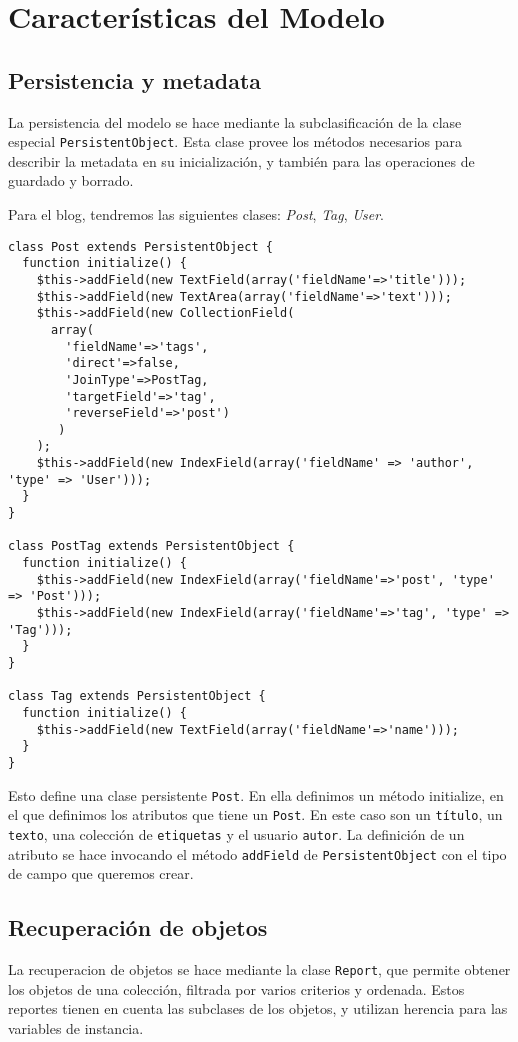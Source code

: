 \section{Características del Modelo}

\subsection{Persistencia y metadata}
\label{sub-pers}

La persistencia del modelo se hace mediante la subclasificación de la clase especial \verb"PersistentObject".
Esta clase provee los métodos necesarios para describir la metadata en su inicialización, y también para las operaciones de guardado y borrado.

Para el blog, tendremos las siguientes clases: \emph{Post}, \emph{Tag}, \emph{User}.

\begin{verbatim}
class Post extends PersistentObject {
  function initialize() {
    $this->addField(new TextField(array('fieldName'=>'title')));
    $this->addField(new TextArea(array('fieldName'=>'text')));
    $this->addField(new CollectionField(
      array(
        'fieldName'=>'tags',
        'direct'=>false,
        'JoinType'=>PostTag,
        'targetField'=>'tag',
        'reverseField'=>'post')
       )
    );
    $this->addField(new IndexField(array('fieldName' => 'author', 'type' => 'User')));
  }
}

class PostTag extends PersistentObject {
  function initialize() {
    $this->addField(new IndexField(array('fieldName'=>'post', 'type' => 'Post')));
    $this->addField(new IndexField(array('fieldName'=>'tag', 'type' => 'Tag')));
  }
}

class Tag extends PersistentObject {
  function initialize() {
    $this->addField(new TextField(array('fieldName'=>'name')));
  }
}
\end{verbatim}

Esto define una clase persistente \verb"Post". En ella definimos un método initialize, en el que definimos los atributos que tiene un \verb"Post". En este caso son un \verb"título", un \verb"texto", una colección de \verb"etiquetas" y el usuario \verb"autor". La definición de un atributo se hace invocando el método \verb"addField" de \verb"PersistentObject" con el tipo de campo que queremos crear.

\subsection{Recuperación de objetos}
La recuperacion de objetos se hace mediante la clase \verb"Report", que permite obtener los objetos de una colección, filtrada por varios criterios y ordenada. Estos reportes tienen en cuenta las subclases de los objetos, y utilizan herencia para las variables de instancia.

